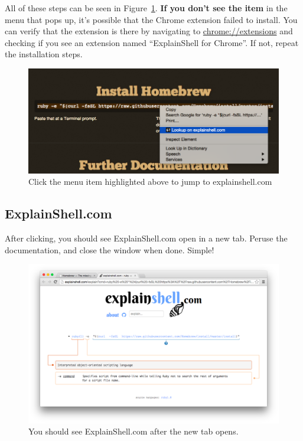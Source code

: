 \documentclass[11pt]{article}
\begin{document}
All of these steps can be seen in Figure~\ref{lookup}. \textbf{If you don't see the item} in the menu that pops up, it's possible that the Chrome extension failed to install. You can verify that the extension is there by navigating to \url{chrome://extensions} and checking if you see an extension named ``ExplainShell for Chrome''. If not, repeat the installation steps.

\begin{figure}[H]
  \begin{center}
    \includegraphics[width=\textwidth, height=\textheight, keepaspectratio]{06lookup}
  \end{center}
  \caption{Click the menu item highlighted above to jump to explainshell.com}
  \label{lookup}
\end{figure}

\subsection{ExplainShell.com}

After clicking, you should see ExplainShell.com open in a new tab. Peruse the documentation, and close the window when done. Simple!

\begin{figure}[H]
  \begin{center}
    \includegraphics[width=\textwidth, height=\textheight, keepaspectratio]{07explainshell-website}
  \end{center}
  \caption{You should see ExplainShell.com after the new tab opens.}
  \label{explainshell-website}
\end{figure}
\end{document}
